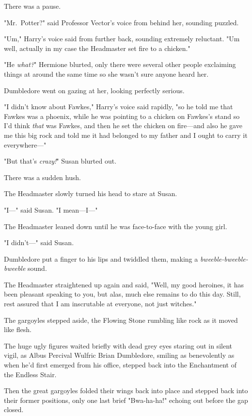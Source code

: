 There was a pause.

"Mr.~Potter?" said Professor Vector's voice from behind her, sounding puzzled.

"Um," Harry's voice said from further back, sounding extremely reluctant.
"Um{\el} well, actually in my case the Headmaster set fire to a chicken."

"He \emph{what?}" Hermione blurted, only there were several other people
exclaiming things at around the same time so she wasn't sure anyone heard her.

Dumbledore went on gazing at her, looking perfectly serious.

"I didn't know about Fawkes," Harry's voice said rapidly, "so he told me that
Fawkes was a phoenix, while he was pointing to a chicken on Fawkes's stand so
I'd think \emph{that} was Fawkes, and then he set the chicken on fire---and
also he gave me this big rock and told me it had belonged to my father and I
ought to carry it everywhere\mbox{---}"

"But that's \emph{crazy!}" Susan blurted out.

There was a sudden hush.

The Headmaster slowly turned his head to stare at Susan.

"I\mbox{---}" said Susan. "I mean---I\mbox{---}"

The Headmaster leaned down until he was face-to-face with the young girl.

"I didn't\mbox{---}" said Susan.

Dumbledore put a finger to his lips and twiddled them, making a
\emph{bweeble-bweeble-bweeble} sound.

The Headmaster straightened up again and said, "Well, my good heroines, it has
been pleasant speaking to you, but alas, much else remains to do this day.
Still, rest assured that I am inscrutable at everyone, not just witches."

The gargoyles stepped aside, the Flowing Stone rumbling like rock as it moved
like flesh.

The huge ugly figures waited briefly with dead grey eyes staring out in silent
vigil, as Albus Percival Wulfric Brian Dumbledore, smiling as benevolently as
when he'd first emerged from his office, stepped back into the Enchantment of
the Endless Stair.

Then the great gargoyles folded their wings back into place and stepped back
into their former positions, only one last brief "Bwa-ha-ha!" echoing out
before the gap closed.

